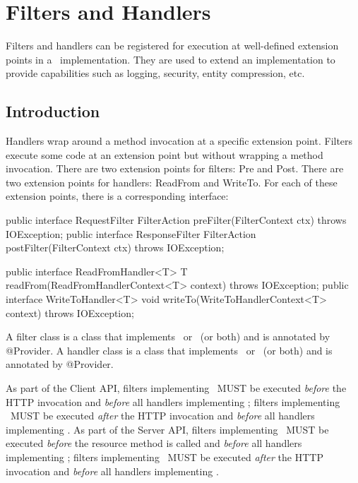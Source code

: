 \chapter{Filters and Handlers}
\label{filters_and_handlers}

Filters and handlers can be registered for execution at well-defined extension points in a \jaxrs\ implementation. They are used to extend an implementation to provide capabilities such as logging, security, entity compression, etc. 

\section{Introduction}
\label{introduction}
Handlers wrap around a method invocation at a specific extension point. Filters execute some code at an extension point but without wrapping a method invocation. There are two extension points for filters: Pre and Post. There are two extension points for handlers: ReadFrom and WriteTo.  For each of these extension points, there is a corresponding interface:

\begin{listing}{1}
public interface RequestFilter {
    FilterAction preFilter(FilterContext ctx) throws IOException;
}
public interface ResponseFilter {
    FilterAction postFilter(FilterContext ctx) throws IOException;
}
\end{listing}

\begin{listing}{1}
public interface ReadFromHandler<T> {
    T readFrom(ReadFromHandlerContext<T> context) throws IOException;
}
public interface WriteToHandler<T> {
    void writeTo(WriteToHandlerContext<T> context) throws IOException;
}
\end{listing}

A filter class is a class that implements \RequestFilter\ or \ResponseFilter\ (or both) and is annotated by @Provider. A handler class is a class that implements \ReadFromHandler\ or \WriteToHandler\ (or both) and is annotated by @Provider. 

As part of the Client API, filters implementing \RequestFilter\ MUST be executed \emph{before} the HTTP invocation and \emph{before} all handlers implementing \WriteToHandler; filters implementing \ResponseFilter\ MUST be executed \emph{after} the HTTP invocation and \emph{before} all handlers implementing \ReadFromHandler. As part of the Server API, filters implementing \RequestFilter\ MUST be executed \emph{before} the resource method is called and \emph{before} all handlers implementing \ReadFromHandler; filters implementing \ResponseFilter\ MUST be executed \emph{after} the HTTP invocation and \emph{before} all handlers implementing \WriteToHandler. 

